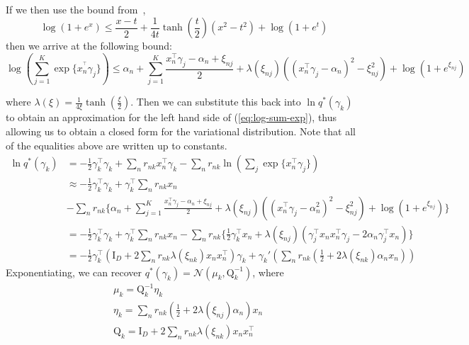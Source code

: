 \documentclass[twoside,11pt]{article}
\newcommand{\tr}{\intercal}
\newcommand{\eye}{\mathrm{I}}
\begin{document}
If we then use the bound from~\cite{jj:2001}, $$\log(1 + e^x) \leq \frac{x - t}{2} + \frac{1}{4t} \tanh \left( \frac{t}{2} \right) (x^2 - t^2) + \log\left(1 + e^t\right)$$ then we arrive at the following bound: 
\begin{equation} \label{eq:jj_bound}
	\log \left( \sum_{j = 1}^K \exp\{ x_n^{^\intercal} \gamma_j \}\right) \leq 
\alpha_n + \sum_{j = 1}^K \frac{x_n^{\intercal} \gamma_j - \alpha_n + \xi_{nj}}{2} + \lambda(\xi_{nj}) \left( (x_n^{\intercal} \gamma_j - \alpha_n)^2 - \xi_{nj}^2\right) + \log \left( 1 + e^{\xi_{nj}}\right)
\end{equation}

where $\lambda(\xi) = \frac{1}{4\xi} \tanh \left( \frac{\xi}{2} \right)$. Then we can substitute this back into $\ln q^{*}(\gamma_k)$ to obtain an approximation for the left hand side of (\ref{eq:log-sum-exp}), thus allowing us to obtain a closed form for the variational distribution. Note that all of the equalities above are written up to constants.
\begin{align*}
    \ln q^{*}(\gamma_k) &= - \frac{1}{2} \gamma_k^{\tr} \gamma_k + \sum_{n} r_{nk} x_n^{\intercal} \gamma_k  - \sum_n r_{nk} \ln \left( \sum_j \exp\{x_n^{\intercal} \gamma_j \} \right)  \\
    & \approx - \frac{1}{2} \gamma_k^{\tr} \gamma_k + \gamma_k^{\intercal} \sum_{n} r_{nk} x_n \\
    & - \sum_n r_{nk} \Bigg\{ \alpha_n + \sum_{j = 1}^K \frac{x_n^{\intercal} \gamma_j - \alpha_n + \xi_{nj}}{2} + \lambda(\xi_{nj}) \left( (x_n^{\intercal} \gamma_j - \alpha_n^2)^2 - \xi_{nj}^2\right) + \log \left( 1 + e^{\xi_{nj}}\right) \Bigg\} \\
    & = - \frac{1}{2} \gamma_k^{\tr} \gamma_k + \gamma_k^{\intercal} \sum_{n} r_{nk} x_n - \sum_n r_{nk} \Bigg\{ \frac{1}{2} \gamma_k^{\tr} x_n + \lambda\left( \xi_{nj} \right) \left( \gamma_j^{\tr}x_n x_n^{\tr} \gamma_j - 2\alpha_n \gamma_j^{\tr} x_n \right)\Bigg\} \\
    &= -\frac{1}{2} \gamma_k^{\tr} \left(\eye_D  + 2 \sum_n r_{nk} \lambda(\xi_{nk}) x_n x_n^{\tr} \right) \gamma_k + \gamma_k' \left( \sum_n r_{nk} \left(\frac{1}{2} + 2 \lambda \left( \xi_{nk}\right) \alpha_n  x_n\right) \right)
\end{align*}
Exponentiating, we can recover $q^{*}(\gamma_k) = \mathcal{N} \left( \mu_k, \mathrm{Q}_k^{-1} \right)$, where
\begin{equation} \label{eq:gamma_params}
\begin{split}
	& \mu_k = \mathrm{Q}_k^{-1} \eta_k \\
	& \eta_k = \sum_{n} r_{nk} \left( \frac{1}{2} + 2 \lambda(\xi_{nj}) \alpha_n \right) x_n \\
	& \mathrm{Q}_k = \eye_D + 2 \sum_{n} r_{nk} \lambda(\xi_{nk}) x_n x_n^{\tr}
\end{split}
\end{equation}
\end{document}

